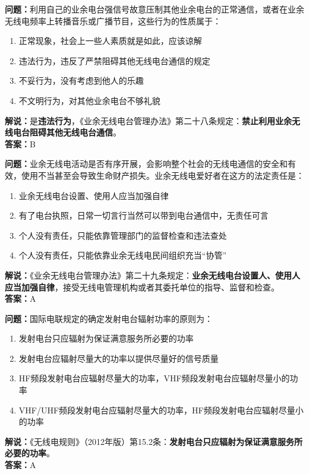 \bigskip


\noindent\textbf{问题：}利用自己的业余电台强信号故意压制其他业余电台的正常通信，或者在业余无线电频率上转播音乐或广播节目，这些行为的性质属于：
\begin{enumerate}[label=\Alph*), leftmargin=3em]
	\item 正常现象，社会上一些人素质就是如此，应该谅解
	\item 违法行为，违反了严禁阻碍其他无线电台通信的规定
	\item 不妥行为，没有考虑到他人的乐趣
	\item 不文明行为，对其他业余电台不够礼貌
\end{enumerate}
\noindent\textbf{解说：}是\textbf{违法行为}，《业余无线电台管理办法》第二十八条规定：\textbf{禁止利用业余无线电台阻碍其他无线电台通信}。\\\noindent\textbf{答案：}B



\bigskip


\noindent\textbf{问题：}业余无线电活动是否有序开展，会影响整个社会的无线电通信的安全和有效，使用不当甚至会导致生命财产损失。业余无线电爱好者在这方的法定责任是：
\begin{enumerate}[label=\Alph*), leftmargin=3em]
	\item 业余无线电台设置、使用人应当加强自律
	\item 有了电台执照，日常一切言行当然可以带到电台通信中，无责任可言
	\item 个人没有责任，只能依靠管理部门的监督检查和违法查处
	\item 个人没有责任，只能依靠业余无线电民间组织充当“协管”
\end{enumerate}
\noindent\textbf{解说：}《业余无线电台管理办法》第二十九条规定：\textbf{业余无线电台设置人、使用人应当加强自律}，接受无线电管理机构或者其委托单位的指导、监督和检查。\\\noindent\textbf{答案：}A



\bigskip


\noindent\textbf{问题：}国际电联规定的确定发射电台辐射功率的原则为：
\begin{enumerate}[label=\Alph*), leftmargin=3em]
	\item 发射电台只应辐射为保证满意服务所必要的功率
	\item 发射电台应辐射尽量大的功率以提供尽量好的信号质量
	\item HF频段发射电台应辐射尽量大的功率，VHF频段发射电台应辐射尽量小的功率
	\item VHF/UHF频段发射电台应辐射尽量大的功率，HF频段发射电台应辐射尽量小的功率
\end{enumerate}
\noindent\textbf{解说：}《无线电规则》（2012年版）第15.2条：\textbf{发射电台只应辐射为保证满意服务所必要的功率}。\\\noindent\textbf{答案：}A



